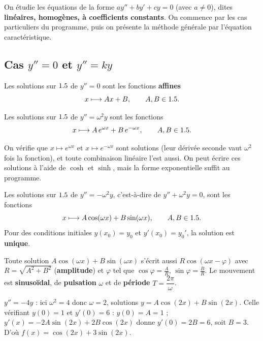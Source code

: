 On étudie les équations de la forme $ay''+by'+cy=0$ (avec $a\neq0$), dites
\textbf{linéaires, homogènes, à coefficients constants}. On commence par les cas
particuliers du programme, puis on présente la méthode générale par l'équation
caractéristique.

\subsection{Cas $y''=0$ et $y''=ky$}

\begin{theoreme}[Équation $y''=0$]
Les solutions sur $1.5$ de $y''=0$ sont les fonctions \textbf{affines}
\[
x\longmapsto Ax+B,\qquad A,B\in1.5.
\]
\end{theoreme}

\begin{theoreme}[Équation $y''=\omega^{2}y$ \ ($\omega>0$)]
Les solutions sur $1.5$ de $y''=\omega^{2}y$ sont les fonctions
\[
x\longmapsto A\,e^{\omega x}+B\,e^{-\omega x},\qquad A,B\in1.5.
\]
\end{theoreme}

\begin{remarque}
On vérifie que $x\mapsto e^{\omega x}$ et $x\mapsto e^{-\omega x}$ sont solutions
(leur dérivée seconde vaut $\omega^2$ fois la fonction), et toute combinaison
linéaire l'est aussi. On peut écrire ces solutions à l'aide de $\cosh$ et
$\sinh$, mais la forme exponentielle suffit au programme.
\end{remarque}

\begin{theoreme}[Équation $y''+\omega^{2}y=0$ \ ($\omega>0$)]
Les solutions sur $1.5$ de $y''=-\omega^{2}y$, c'est-à-dire de $y''+\omega^2 y=0$,
sont les fonctions
\[
x\longmapsto A\cos(\omega x)+B\sin(\omega x),\qquad A,B\in1.5.
\]
Pour des conditions initiales $y(x_0)=y_0$ et $y'(x_0)=y_0'$, la solution est
\textbf{unique}.
\end{theoreme}

\begin{remarque}
Toute solution $A\cos(\omega x)+B\sin(\omega x)$ s'écrit aussi
$R\cos(\omega x-\varphi)$ avec $R=\sqrt{A^{2}+B^{2}}$ (\textbf{amplitude}) et
$\varphi$ tel que $\cos\varphi=\frac{A}{R}$, $\sin\varphi=\frac{B}{R}$. Le
mouvement est \textbf{sinusoïdal}, de \textbf{pulsation} $\omega$ et de
\textbf{période} $T=\dfrac{2\pi}{\omega}$.
\end{remarque}

\begin{exemple}
$y''=-4y$ : ici $\omega^{2}=4$ donc $\omega=2$, solutions
$y=A\cos(2x)+B\sin(2x)$. Celle vérifiant $y(0)=1$ et $y'(0)=6$ :
$y(0)=A=1$ ; $y'(x)=-2A\sin(2x)+2B\cos(2x)$ donne $y'(0)=2B=6$, soit $B=3$.
D'où $f(x)=\cos(2x)+3\sin(2x)$.
\end{exemple}

